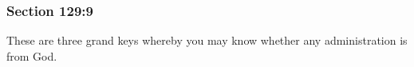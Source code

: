 	\subsubsection{Section 129:9} %
		\label{DC129-9}

		These are three grand keys whereby you may know whether any administration is from God.

